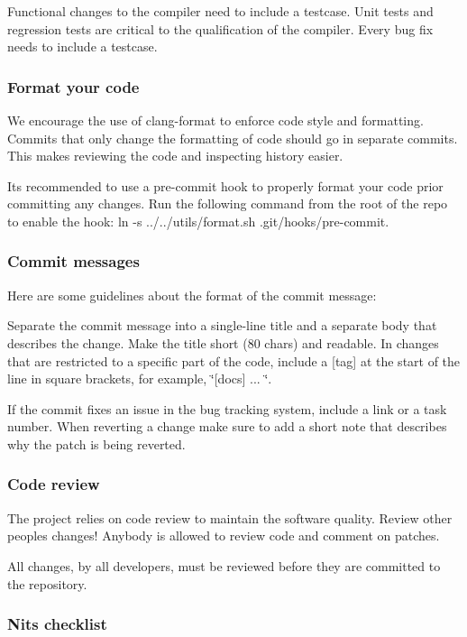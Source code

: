 Functional changes to the compiler need to include a testcase. Unit tests and regression tests are critical to the qualification of the compiler. Every bug fix needs to include a testcase.

\subsubsection*{Format your code}

We encourage the use of clang-\/format to enforce code style and formatting. Commits that only change the formatting of code should go in separate commits. This makes reviewing the code and inspecting history easier.

It\textquotesingle{}s recommended to use a pre-\/commit hook to properly format your code prior committing any changes. Run the following command from the root of the repo to enable the hook\+: {\ttfamily ln -\/s ../../utils/format.sh .git/hooks/pre-\/commit}.

\subsubsection*{Commit messages}

Here are some guidelines about the format of the commit message\+:

Separate the commit message into a single-\/line title and a separate body that describes the change. Make the title short (80 chars) and readable. In changes that are restricted to a specific part of the code, include a \mbox{[}tag\mbox{]} at the start of the line in square brackets, for example, \char`\"{}\mbox{[}docs\mbox{]} ... \char`\"{}.

If the commit fixes an issue in the bug tracking system, include a link or a task number. When reverting a change make sure to add a short note that describes why the patch is being reverted.

\subsubsection*{Code review}

The project relies on code review to maintain the software quality. Review other people\textquotesingle{}s changes! Anybody is allowed to review code and comment on patches.

All changes, by all developers, must be reviewed before they are committed to the repository.

\subsubsection*{Nits checklist}

